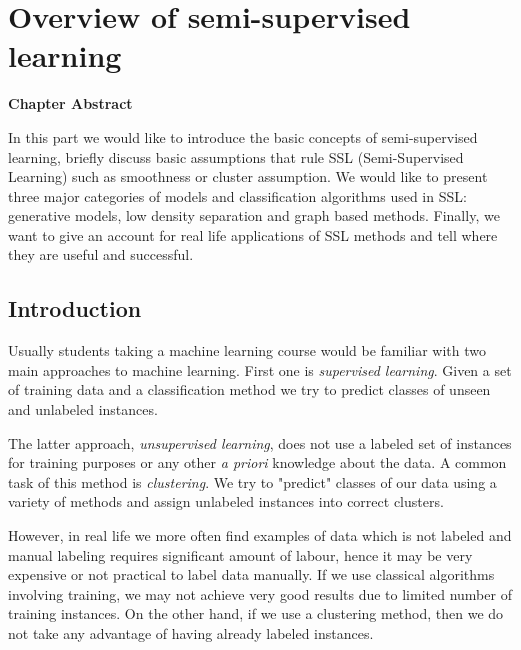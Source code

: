 \documentclass[12pt, a4paper, pdflatex]{report}
\newenvironment{chapabstract}
{
	\vspace{0.5cm}
	\small
	\begin{center}
    \bfseries Chapter Abstract
    \end{center}
}{\vspace{1.5cm}}
\begin{document}
\newpage

\tableofcontents
\thispagestyle{empty}
\cleardoublepage
\pagestyle{plain}
\setcounter{page}{1}

\newpage

\chapter{Overview of semi-supervised learning\label{ch:sstheory}}

\begin{chapabstract}
In this part we would like to introduce the basic concepts of semi-supervised learning, briefly discuss basic assumptions that rule SSL (Semi-Supervised Learning) such as smoothness or cluster assumption. We would like to present three major categories of models and classification algorithms used in SSL: generative models, low density separation and graph based methods. Finally, we want to give an account for real life applications of SSL methods and tell where they are useful and successful.
\end{chapabstract}


\section{Introduction}
Usually students taking a machine learning course would be familiar with two main approaches to machine learning. First one is \textit{supervised learning}. Given a set of training data and a classification method we try to predict classes of unseen and unlabeled instances. 

The latter approach, \textit{unsupervised learning}, does not use a labeled set of instances for training purposes or any other \emph{a priori} knowledge about the data. A common task of this method is \textit{clustering}. We try to "predict" classes of our data using a variety of methods and assign unlabeled instances into correct clusters.

However, in real life we more often find examples of data which is not labeled and manual labeling requires significant amount of labour, hence it may be very expensive or not practical to label data manually\cite{Blum98, He07}. If we use classical algorithms involving training, we may not achieve very good results due to limited number of training instances. On the other hand, if we use a clustering method, then we do not take any advantage of having already labeled instances.
\end{document}
